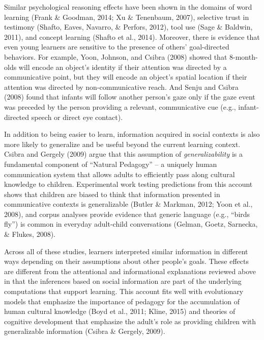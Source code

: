 \documentclass[english,man]{apa6}
\theoremstyle{definition}
\theoremstyle{definition}
\theoremstyle{definition}
\theoremstyle{remark}
\begin{document}
Similar psychological reasoning effects have been shown in the domains
of word learning (Frank \& Goodman, 2014; Xu \& Tenenbaum, 2007),
selective trust in testimony (Shafto, Eaves, Navarro, \& Perfors, 2012),
tool use (Sage \& Baldwin, 2011), and concept learning (Shafto et al.,
2014). Moreover, there is evidence that even young learners are
sensitive to the presence of others' goal-directed behaviors. For
example, Yoon, Johnson, and Csibra (2008) showed that 8-month-olds will
encode an object's identity if their attention was directed by a
communicative point, but they will encode an object's spatial location
if their attention was directed by non-communicative reach. And Senju
and Csibra (2008) found that infants will follow another person's gaze
only if the gaze event was preceded by the person providing a relevant,
communicative cue (e.g., infant-directed speech or direct eye contact).

In addition to being easier to learn, information acquired in social
contexts is also more likely to generalize and be useful beyond the
current learning context. Csibra and Gergely (2009) argue that this
assumption of \emph{generalizability} is a fundamental component of
\enquote{Natural Pedagogy} -- a uniquely human communication system that
allows adults to efficiently pass along cultural knowledge to children.
Experimental work testing predictions from this account shows that
children are biased to think that information presented in communicative
contexts is generalizable (Butler \& Markman, 2012; Yoon et al., 2008),
and corpus analyses provide evidence that generic language (e.g.,
\enquote{birds fly}) is common in everyday adult-child conversations
(Gelman, Goetz, Sarnecka, \& Flukes, 2008).

Across all of these studies, learners interpreted similar information in
different ways depending on their assumptions about other people's
goals. These effects are different from the attentional and
informational explanations reviewed above in that the inferences based
on social information are part of the underlying computations that
support learning. This account fits well with evolutionary models that
emphasize the importance of pedagogy for the accumulation of human
cultural knowledge (Boyd et al., 2011; Kline, 2015) and theories of
cognitive development that emphasize the adult's role as providing
children with generalizable information (Csibra \& Gergely, 2009).
\end{document}
